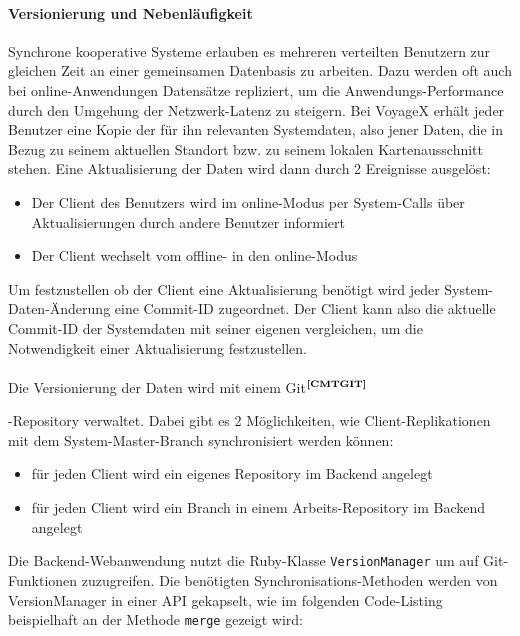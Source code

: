 \enlargethispage{2\baselineskip} %
\paragraph{Versionierung und Nebenläufigkeit}
Synchrone kooperative Systeme erlauben es mehreren verteilten Benutzern zur gleichen Zeit an einer gemeinsamen Datenbasis zu arbeiten. Dazu werden oft auch bei online-Anwendungen Datensätze repliziert, um die Anwendungs-Performance durch den Umgehung der Netzwerk-Latenz zu steigern. Bei VoyageX erhält jeder Benutzer
eine Kopie der für ihn relevanten Systemdaten, also jener Daten, die in Bezug zu seinem aktuellen Standort bzw. zu seinem lokalen Kartenausschnitt stehen. Eine Aktualisierung der Daten wird dann durch 2 Ereignisse ausgelöst:
\begin{itemize}[leftmargin=*,noitemsep,topsep=1ex,parsep=0pt,partopsep=0pt]
\item Der Client des Benutzers wird im online-Modus per System-Calls über Aktualisierungen durch andere Benutzer informiert
\item  Der Client wechselt vom offline- in den online-Modus
\end{itemize}
Um festzustellen ob der Client eine Aktualisierung benötigt wird jeder System-Daten-Änderung eine Commit-ID zugeordnet.%
Der Client kann also die aktuelle Commit-ID der Systemdaten mit seiner eigenen vergleichen, um die Notwendigkeit einer Aktualisierung festzustellen.\\ \\ 
Die Versionierung der Daten wird mit einem Git$^{\textbf{\ref{CMTGIT}}}$%
\addtocounter{footnote}{1}%
%
-Repository verwaltet. Dabei gibt es 2 Möglichkeiten, wie Client-Replikationen mit dem System-Master-Branch synchronisiert werden können:
\begin{itemize}[leftmargin=*,noitemsep,topsep=1ex,parsep=0pt,partopsep=0pt]
\item für jeden Client wird ein eigenes Repository im Backend angelegt
\item für jeden Client wird ein Branch in einem Arbeits-Repository im Backend angelegt
\end{itemize}
Die Backend-Webanwendung nutzt die Ruby-Klasse \texttt{VersionManager} um auf Git-Funktionen zuzugreifen.
Die benötigten Synchronisations-Methoden werden von VersionManager in einer API gekapselt, wie im folgenden Code-Listing beispielhaft an der Methode \texttt{merge} gezeigt wird:
